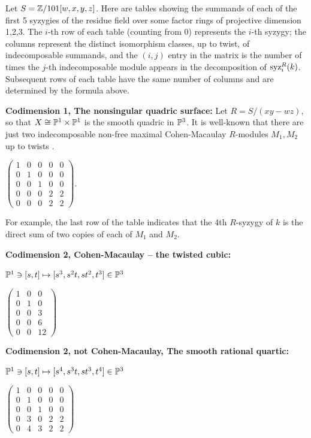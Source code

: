 \documentclass[11pt]{amsart}
\begin{document}
\begin{example}
Let $S= {\mathbb Z}/101[w,x,y,z]$. Here are tables showing the summands of each of the first 5 syzygies of the residue field over some factor rings of projective dimension 1,2,3. The $i$-th row
of each table (counting from 0) represents the $i$-th syzygy; the columns represent the distinct
isomorphism classes, up to twist, of indecomposable
summands, and the $(i,j)$ entry in the matrix is the number of times the $j$-th
indecomposable module appears in the decomposition of $\operatorname{syz}_i^R(k)$. Subsequent rows of each table have the same number of columns and are determined by the formula above. \smallskip

\noindent \textbf{Codimension 1, The nonsingular quadric surface:}
 Let $R = S/(xy-wz)$, so that $X\cong {\mathbb P}^{1}\times {\mathbb P}^{1}$ is the smooth quadric in ${\mathbb P}^{3}$. It is well-known that there are just two indecomposable non-free maximal Cohen-Macaulay $R$-modules $M_{1}, M_{2}$ up to twists \cite{Knoerrer}.
 
 $\left(\!\begin{array}{ccccc}
      1&0&0&0&0\\
      0&1&0&0&0\\
      0&0&1&0&0\\
      0&0&0&2&2\\
      0&0&0&2&2
      \end{array}\!\right)$.
      
For example, the last row of the table indicates that the 4th $R$-syzygy of $k$ is the direct sum of two copies of each of $M_{1}$ and $M_{2}$.
 
\smallskip

\noindent\textbf{Codimension 2, Cohen-Macaulay -- the twisted cubic:}

${\mathbb P}^1 \ni [s,t] \mapsto [s^3, s^2t, st^2, t^3]\in {\mathbb P}^3$

$\left(\!\begin{array}{ccc}
       1&0&0\\
       0&1&0\\
       0&0&3\\
       0&0&6\\
       0&0&12
       \end{array}\!\right)$
\smallskip

\noindent\textbf{Codimension 2,  not Cohen-Macaulay, The smooth rational quartic:}

${\mathbb P}^1 \ni [s,t] \mapsto [s^4, s^3t, st^3, t^4]\in {\mathbb P}^3$

$\left(\!\begin{array}{ccccc}
       1&0&0&0&0\\
       0&1&0&0&0\\
       0&0&1&0&0\\
       0&3&0&2&2\\
       0&4&3&2&2
       \end{array}\!\right)$

\end{example}
\end{document}
